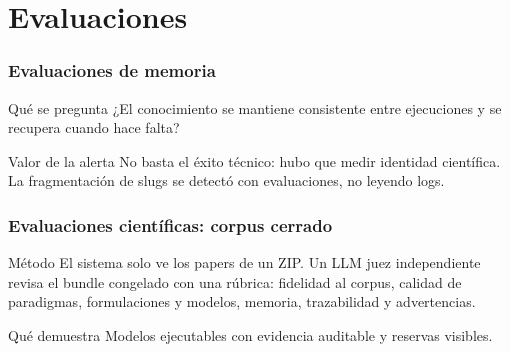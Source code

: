 \documentclass{beamer}
\begin{document}
\section{Evaluaciones}

\begin{frame}
  \frametitle{Evaluaciones de memoria}
  \small
  \begin{block}{Qué se pregunta}
    ¿El conocimiento se mantiene consistente entre ejecuciones y se recupera
    cuando hace falta?
  \end{block}

  \begin{table}
  \end{table}

  \begin{alertblock}{Valor de la alerta}
    No basta el éxito técnico: hubo que medir identidad científica. La
    fragmentación de slugs se detectó con evaluaciones, no leyendo logs.
  \end{alertblock}
\end{frame}

\begin{frame}
  \frametitle{Evaluaciones científicas: corpus cerrado}
  \small
  \begin{block}{Método}
    El sistema solo ve los papers de un ZIP. Un LLM juez independiente revisa
    el bundle congelado con una rúbrica: fidelidad al corpus, calidad de
    paradigmas, formulaciones y modelos, memoria, trazabilidad y advertencias.
  \end{block}

  \begin{table}
  \end{table}

  \begin{exampleblock}{Qué demuestra}
    Modelos ejecutables con evidencia auditable y reservas visibles.
  \end{exampleblock}
\end{frame}
\end{document}
